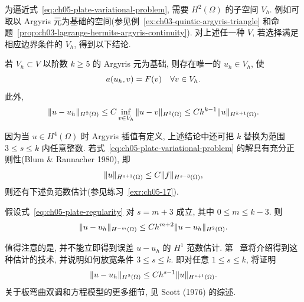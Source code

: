 为逼近式~\eqref{eq:ch05-plate-variational-problem}, 需要 $H^2(\Omega)$ 的子空间 $V_h$. 例如可取以 Argyris 元为基础的空间(参见例~\ref{ex:ch03-quintic-argyris-triangle} 和命题~\ref{prop:ch03-lagrange-hermite-argyris-continuity}). 对上述任一种 $V$, 若选择满足相应边界条件的 $V_h$, 得到以下结论.

\begin{Theorem}
\label{thm:ch05-argyris-plate-error}
若 $V_h\subset V$ 以阶数 $k\geq5$ 的 Argyris 元为基础, 则存在唯一的 $u_h\in V_h$, 使
\[
\MathBookFormulaID{formula-ch05-discrete-plate-problem}
a(u_h,v)=F(v)\quad\forall v\in V_h.
\]
此外,
\[
\MathBookFormulaID{formula-ch05-argyris-plate-error}
\|u-u_h\|_{H^2(\Omega)}
\leq C\inf_{v\in V_h}\|u-v\|_{H^2(\Omega)}
\leq Ch^{k-1}\|u\|_{H^{k+1}(\Omega)}.
\]
\end{Theorem}

因为当 $u\in H^4(\Omega)$ 时 Argyris 插值有定义, 上述结论中还可把 $k$ 替换为范围 $3\leq s\leq k$ 内任意整数. 若式~\eqref{eq:ch05-plate-variational-problem} 的解具有充分正则性(Blum \& Rannacher 1980), 即
\begin{equation}
\MathBookFormulaID{formula-ch05-plate-regularity}
\label{eq:ch05-plate-regularity}
\|u\|_{H^{s+1}(\Omega)}\leq C\|f\|_{H^{s-3}(\Omega)},
\end{equation}
则还有下述负范数估计(参见练习~\ref{exr:ch05-17}).

\begin{Theorem}
\label{thm:ch05-plate-negative-norm-error}
假设式~\eqref{eq:ch05-plate-regularity} 对 $s=m+3$ 成立, 其中 $0\leq m\leq k-3$. 则
\[
\MathBookFormulaID{formula-ch05-plate-negative-norm-error}
\|u-u_h\|_{H^{-m}(\Omega)}
\leq Ch^{m+2}\|u-u_h\|_{H^2(\Omega)}.
\]
\end{Theorem}

值得注意的是, 并不能立即得到误差 $u-u_h$ 的 $H^1$ 范数估计. 第~ 章将介绍得到这种估计的技术, 并说明如何放宽条件 $3\leq s\leq k$. 即对任意 $1\leq s\leq k$, 将证明
\[
\MathBookFormulaID{formula-ch05-future-relaxed-plate-error}
\|u-u_h\|_{H^2(\Omega)}\leq Ch^{s-1}\|u\|_{H^{s+1}(\Omega)}.
\]
关于板弯曲双调和方程模型的更多细节, 见 Scott (1976) 的综述.
